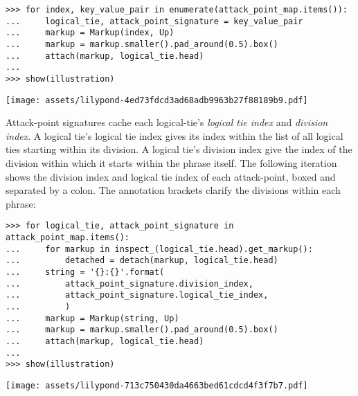 \begin{abjadbookoutput}
\begin{singlespacing}
\vspace{-0.5\baselineskip}
\begin{lstlisting}
>>> for index, key_value_pair in enumerate(attack_point_map.items()):
...     logical_tie, attack_point_signature = key_value_pair
...     markup = Markup(index, Up)
...     markup = markup.smaller().pad_around(0.5).box()
...     attach(markup, logical_tie.head)
...
>>> show(illustration)
\end{lstlisting}
\noindent\texttt{[image: assets/lilypond-4ed73fdcd3ad68adb9963b27f88189b9.pdf]}
\end{singlespacing}
\end{abjadbookoutput}

\noindent Attack-point signatures cache each logical-tie's \emph{logical tie
index} and \emph{division index}. A logical tie's logical tie index gives its
index within the list of all logical ties starting within its division. A
logical tie's division index give the index of the division within which it
starts within the phrase itself. The following iteration shows the division
index and logical tie index of each attack-point, boxed and separated by a
colon. The annotation brackets clarify the divisions within each phrase:

\begin{comment}
<abjad>[stylesheet=../consort.ily]
for logical_tie, attack_point_signature in attack_point_map.items():
    for markup in inspect_(logical_tie.head).get_markup():
        detached = detach(markup, logical_tie.head)
    string = '{}:{}'.format(
        attack_point_signature.division_index,
        attack_point_signature.logical_tie_index,
        )
    markup = Markup(string, Up)
    markup = markup.smaller().pad_around(0.5).box()
    attach(markup, logical_tie.head)

show(illustration)
</abjad>
\end{comment}

\begin{abjadbookoutput}
\begin{singlespacing}
\vspace{-0.5\baselineskip}
\begin{lstlisting}
>>> for logical_tie, attack_point_signature in attack_point_map.items():
...     for markup in inspect_(logical_tie.head).get_markup():
...         detached = detach(markup, logical_tie.head)
...     string = '{}:{}'.format(
...         attack_point_signature.division_index,
...         attack_point_signature.logical_tie_index,
...         )
...     markup = Markup(string, Up)
...     markup = markup.smaller().pad_around(0.5).box()
...     attach(markup, logical_tie.head)
...
>>> show(illustration)
\end{lstlisting}
\noindent\texttt{[image: assets/lilypond-713c750430da4663bed61cdcd4f3f7b7.pdf]}
\end{singlespacing}
\end{abjadbookoutput}


